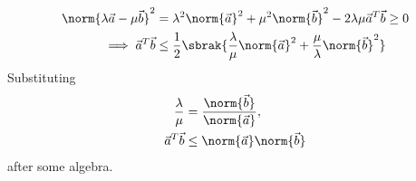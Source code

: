 \begin{align}
\norm{\lambda\vec{a}-\mu \vec{b}}^2 &= \lambda^2\norm{\vec{a}}^2+\mu^2\norm{\vec{b}}^2-2\lambda \mu \vec{a}^T\vec{b} \ge 0
\\
\implies  \vec{a}^T\vec{b} &\le \frac{1}{2}\sbrak{\frac{\lambda}{\mu}\norm{\vec{a}}^2+\frac{\mu}{\lambda}\norm{\vec{b}}^2}
\end{align}
Substituting 
\begin{align}
\frac{\lambda}{\mu} &= \frac{\norm{\vec{b}}}{\norm{\vec{a}}},
\\
  \vec{a}^T\vec{b} &\le \norm{\vec{a}}\norm{\vec{b}}
\end{align}
after some algebra.

